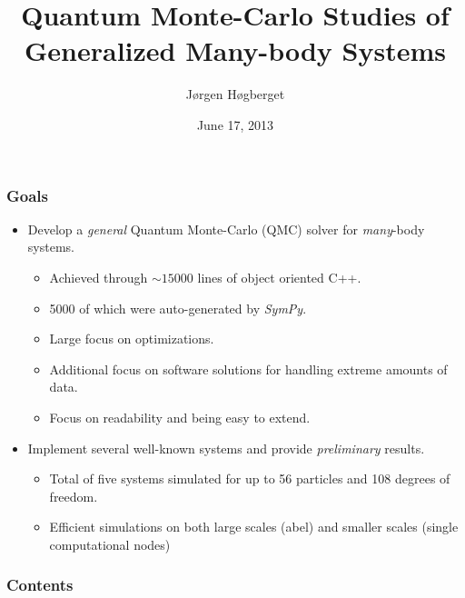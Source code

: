 \documentclass{beamer}
\title[Master Presentation]{Quantum Monte-Carlo Studies of Generalized Many-body Systems}
\author{Jørgen Høgberget}
\date{June 17, 2013}
\begin{document}
\begin{frame}
\titlepage
\end{frame}

\begin{frame}
 \frametitle{Goals}
  \begin{itemize}
   \item Develop a \emph{general} Quantum Monte-Carlo (QMC) solver for \emph{many}-body systems. 
   \begin{itemize}
      \item Achieved through $\sim 15000$ lines of object oriented C++.
      \item 5000 of which were auto-generated by \textit{SymPy}.
      \item Large focus on optimizations. 
      \item Additional focus on software solutions for handling extreme amounts of data.
      \item Focus on readability and being easy to extend. 
   \end{itemize}
  \end{itemize}
  \begin{itemize}
   \pause \item Implement several well-known systems and provide \emph{preliminary} results.
   \begin{itemize}
      \item Total of five systems simulated for up to 56 particles and 108 degrees of freedom.
      \item Efficient simulations on both large scales (abel) and smaller scales (single computational nodes)
   \end{itemize}
  \end{itemize}
  
\end{frame}

\begin{frame}
 \frametitle{Contents}
 \tableofcontents[hideallsubsections]
\end{frame}


% 


\end{document}
